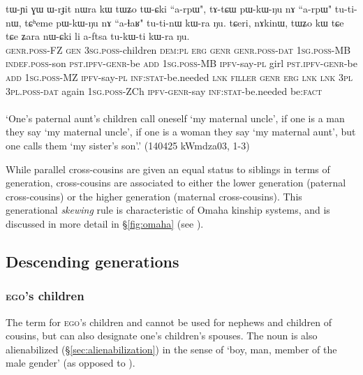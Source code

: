 \begin{exe}
\ex \label{ex:MBCh.FZCh}
\gll tɯ-ɲi ɣɯ ɯ-rɟit nɯra kɯ tɯʑo tɯ-ɕki ``a-rpɯ", tɤ-tɕɯ pɯ-kɯ-ŋu nɤ ``a-rpɯ" tu-ti-nɯ, tɕʰeme pɯ-kɯ-ŋu nɤ ``a-ɬaʁ" tu-ti-nɯ kɯ-ra ŋu. tɕeri, nɤkinɯ, tɯʑo kɯ tɕe tɕe ʑara nɯ-ɕki li a-ftsa tu-kɯ-ti kɯ-ra ŋu. \\
\textsc{genr}.\textsc{poss}-FZ \textsc{gen} \textsc{3sg}.\textsc{poss}-children \textsc{dem}:\textsc{pl} \textsc{erg} \textsc{genr} \textsc{genr}.\textsc{poss}-\textsc{dat} \textsc{1sg}.\textsc{poss}-MB \textsc{indef}.\textsc{poss}-son \textsc{pst}.\textsc{ipfv}-\textsc{genr}-be \textsc{add} \textsc{1sg}.\textsc{poss}-MB \textsc{ipfv}-say-\textsc{pl} girl \textsc{pst}.\textsc{ipfv}-\textsc{genr}-be \textsc{add} \textsc{1sg}.\textsc{poss}-MZ \textsc{ipfv}-say-\textsc{pl} \textsc{inf}:\textsc{stat}-be.needed \textsc{lnk} \textsc{filler} \textsc{genr} \textsc{erg} \textsc{lnk} \textsc{lnk} \textsc{3pl} \textsc{3pl}.\textsc{poss}-\textsc{dat} again \textsc{1sg}.\textsc{poss}-ZCh \textsc{ipfv}-\textsc{genr}-say \textsc{inf}:\textsc{stat}-be.needed be:\textsc{fact} \\
\\
\glt `One's paternal aunt's children call oneself  `my maternal uncle', if one is a man they say `my maternal uncle', if one is a woman they say  `my maternal aunt', but one calls them  `my sister's son'.' (140425 kWmdza03, 1-3)
\end{exe}

While parallel cross-cousins are given an equal status to siblings in terms of generation, cross-cousins are associated to either the lower generation (paternal cross-cousins) or the higher generation (maternal cross-cousins). This generational \textit{skewing} rule is characteristic of Omaha kinship systems, and is discussed in more detail in §\ref{fig:omaha} (see ).

\subsection{Descending generations} \label{sec:G-1}

\subsubsection{\textsc{ego}'s children}
The term for \textsc{ego}'s children  and  cannot be used for nephews and children of cousins, but can also designate one's children's spouses. The noun  is also alienabilized (§\ref{sec:alienabilization}) in the sense of `boy, man, member of the male gender' (as opposed to ).

